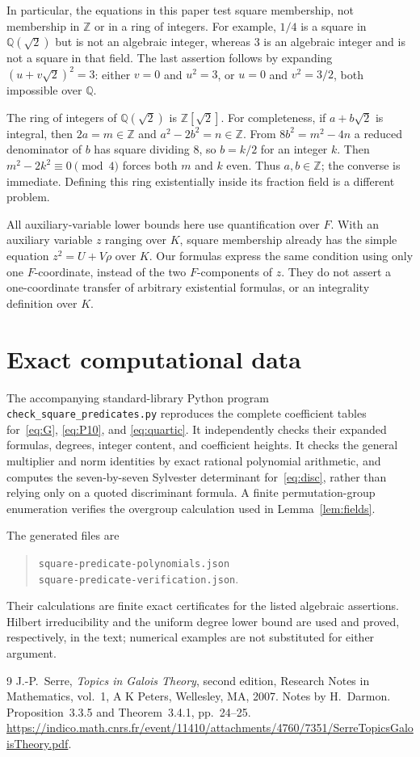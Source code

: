 \documentclass[11pt,a4paper]{article}
\newcommand{\Q}{\mathbb Q}\newcommand{\Z}{\mathbb Z}
\begin{document}
In particular, the equations in this paper test square membership,
not membership in $\Z$ or in a ring of integers. For example, $1/4$
is a square in $\Q(\sqrt2)$ but is not an algebraic integer, whereas
$3$ is an algebraic integer and is not a square in that field. The
last assertion follows by expanding $(u+v\sqrt2)^2=3$: either
$v=0$ and $u^2=3$, or $u=0$ and $v^2=3/2$, both impossible over $\Q$.

The ring of integers of $\Q(\sqrt2)$ is $\Z[\sqrt2]$. For completeness,
if $a+b\sqrt2$ is integral, then $2a=m\in\Z$ and
$a^2-2b^2=n\in\Z$. From $8b^2=m^2-4n$ a reduced denominator
of $b$ has square dividing $8$, so $b=k/2$ for an integer $k$.
Then $m^2-2k^2\equiv0\pmod4$ forces both $m$ and $k$ even.
Thus $a,b\in\Z$; the converse is immediate. Defining this ring
existentially inside its fraction field is a different problem.

All auxiliary-variable lower bounds here use quantification over $F$.
With an auxiliary variable $z$ ranging over $K$, square membership
already has the simple equation $z^2=U+V\rho$ over $K$.
Our formulas express the same condition using only one $F$-coordinate,
instead of the two $F$-components of $z$. They do not assert a
one-coordinate transfer of arbitrary existential formulas, or an
integrality definition over $K$.

\section{Exact computational data}

The accompanying standard-library Python program
\texttt{check\_square\_predicates.py} reproduces the complete
coefficient tables for~\eqref{eq:G}, \eqref{eq:P10}, and
\eqref{eq:quartic}. It independently checks their expanded formulas,
degrees, integer content, and coefficient heights. It checks the
general multiplier and norm identities by exact rational polynomial
arithmetic, and computes the seven-by-seven Sylvester determinant
for~\eqref{eq:disc}, rather than relying only on a quoted discriminant
formula. A finite permutation-group enumeration verifies the
overgroup calculation used in Lemma~\ref{lem:fields}.

The generated files are
\begin{quote}\small
\nolinkurl{square-predicate-polynomials.json}\\
\nolinkurl{square-predicate-verification.json}.
\end{quote}
Their calculations are
finite exact certificates for the listed algebraic assertions.
Hilbert irreducibility and the uniform degree lower bound are used
and proved, respectively, in the text; numerical examples are not
substituted for either argument.

\begin{thebibliography}{9}
J.-P.~Serre, \emph{Topics in Galois Theory}, second edition,
Research Notes in Mathematics, vol.~1, A K Peters, Wellesley, MA,
2007. Notes by H.~Darmon. Proposition~3.3.5 and Theorem~3.4.1,
pp.~24--25.
\url{https://indico.math.cnrs.fr/event/11410/attachments/4760/7351/SerreTopicsGaloisTheory.pdf}.
\end{thebibliography}
\end{document}
